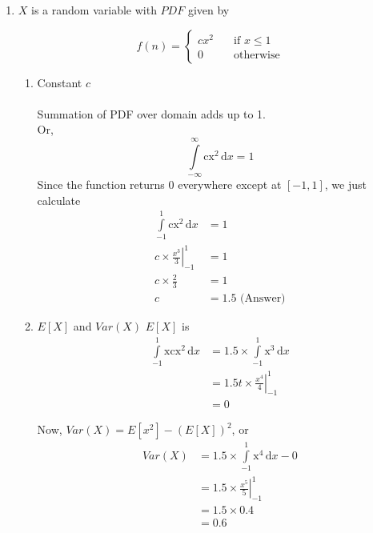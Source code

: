 \documentclass[a4paper, 12pt]{article}
\begin{document}
\begin{enumerate}

	\item 
	$X$ is a random variable with $PDF$ given by
	
	\[ f(n) = 
		\begin{cases}
			cx^2 & \quad \text{if } x \leq 1 \\
			0 & \quad \text{otherwise}
		\end{cases}
	\]

	\begin{enumerate}
		\item Constant $c$
		\\ \\
		Summation of PDF over domain adds up to 1.\\
		Or, 
		\[
		\int\limits_{-\infty}^{\infty} \mathrm{cx^2}
		\, \mathrm{d}x = 1
		\]
		Since the function returns $0$ everywhere except
		 at $[-1, 1]$, 	we just calculate
		\begin{align*}
			\int\limits_{-1}^{1} \mathrm{cx^2}\, 
			\mathrm{d}x &= 1\\
			c\times \left.\frac{x^3}{3}\right|_{-1}^{1} &= 1\\
			c\times \frac{2}{3} &= 1\\
			c &= 1.5 \text{ (Answer)}
		\end{align*}				
		
		\item $E\left[X\right]$ and $Var\left(X\right)$
		$E[X]$ is 
		\begin{align*}
			\int\limits_{-1}^{1} \mathrm{xcx^2}\,\mathrm{d}x
			&= 1.5 \times \int\limits_{-1}^{1} 
			\mathrm{x^3}\,\mathrm{d}x\\
			&= 1.5 t\times \left.\frac{x^4}{4}\right|_{-1}^{1}\\
			&= 0
		\end{align*}
			
		Now, $Var(X) = E[x^2] - (E[X])^2$, or\\
		\begin{align*}
			Var(X) &= 1.5\times \int\limits_{-1}^{1} 
			\mathrm{x^4}\,\mathrm{d}x - 0\\
			&= 1.5\times \left.\frac{x^5}{5}\right|_{-1}^{1} \\
			&= 1.5 \times 0.4\\
			&= 0.6
		\end{align*}
		

\end{enumerate}
\end{enumerate}
\end{document}

